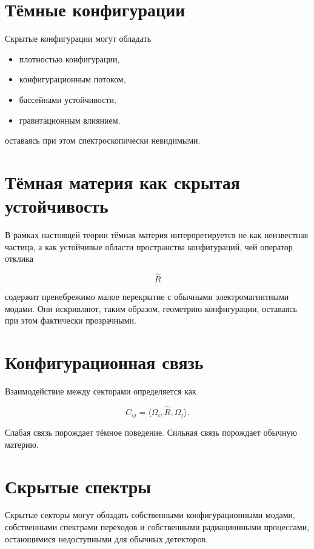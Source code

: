 \section{Тёмные конфигурации}

Скрытые конфигурации могут обладать

\begin{itemize}

\item плотностью конфигурации,

\item конфигурационным потоком,

\item бассейнами устойчивости,

\item гравитационным влиянием.

\end{itemize}

оставаясь при этом спектроскопически невидимыми.

\section{Тёмная материя как скрытая устойчивость}

В рамках настоящей теории тёмная материя интерпретируется не как неизвестная частица, а как устойчивые области пространства конфигураций, чей оператор отклика

\[ \hat R \]

содержит пренебрежимо малое перекрытие с обычными электромагнитными модами. Они искривляют, таким образом, геометрию конфигурации, оставаясь при этом фактически прозрачными.

\section{Конфигурационная связь}

Взаимодействие между секторами определяется как

\[ \boxed{ C_{ij} = \langle \Omega_i, \hat R, \Omega_j \rangle. } \]

Слабая связь порождает тёмное поведение. Сильная связь порождает обычную материю.

\section{Скрытые спектры}

Скрытые секторы могут обладать собственными конфигурационными модами, собственными спектрами переходов и собственными радиационными процессами, остающимися недоступными для обычных детекторов.

